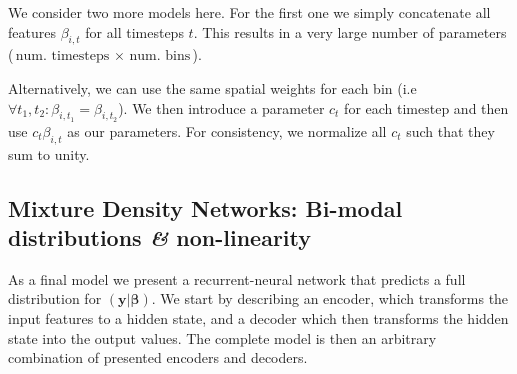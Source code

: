 \documentclass[nobib]{tufte-handout}
\begin{document}
We consider two more models here.
For the first one we simply concatenate all features \(\beta_{i, t}\) for all timesteps \(t\).
This results in a very large number of parameters (\(\text{num. timesteps } \times \text{ num. bins}\)).

Alternatively, we can use the same spatial weights for each bin (i.e\ \( \forall t_1, t_2: \beta_{i, t_1} = \beta_{i, t_2}\)).
We then introduce a parameter \(c_t\) for each timestep and then use $c_t \beta_{i,t}$ as our parameters.
For consistency, we normalize all \(c_t\) such that they sum to unity.

\subsection{Mixture Density Networks: Bi-modal distributions \textit{\&} non-linearity}
As a final model we present a recurrent-neural network that predicts a full distribution for \(\left( \bm{y} | \bm{\beta} \right)\).
We start by describing an encoder, which transforms the input features to a hidden state, and a decoder which then transforms the hidden state into the output values.
The complete model is then an arbitrary combination of presented encoders and decoders.
\end{document}

